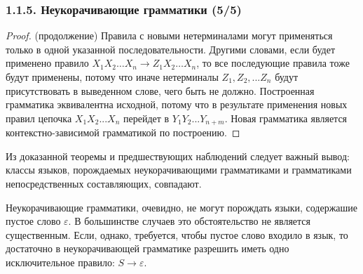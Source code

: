 \begin{frame}
\frametitle{1.1.5. Неукорачивающие грамматики (5/5)}
\begin{proof} (продолжение)
Правила с новыми нетерминалами могут применяться только в одной указанной последовательности. 
Другими словами, если будет применено правило 
$X_1 X_2 \dots X_n \rightarrow Z_1 X_2 \dots X_n$, то все последующие правила тоже будут применены, потому что иначе нетерминалы $Z_1, Z_2, ... Z_n$ будут присутствовать в выведенном слове, чего быть не должно.
Построенная грамматика эквивалентна исходной, потому что в результате применения новых правил 
цепочка $X_1 X_2 ... X_n$ перейдет в $Y_1 Y_2 ... Y_{n+m}$. 
Новая грамматика является контекстно-зависимой грамматикой по построению.
\end{proof}

\medskip
Из доказанной теоремы и предшествующих наблюдений
следует важный вывод:
классы языков, порождаемых неукорачивающими грамматиками и грамматиками непосредственных составляющих, совпадают. 

\begin{remark}
Неукорачивающие грамматики,
очевидно, не могут порождать
языки, содержашие пустое слово $\varepsilon$.
В большинстве случаев это обстоятельство
не является существенным.
Если, однако, требуется,
чтобы пустое слово входило
в язык, то достаточно
в неукорачивающей 
грамматике разрешить иметь
одно исключительное правило:
$S\to\varepsilon$. 
\end{remark}

\end{frame}

